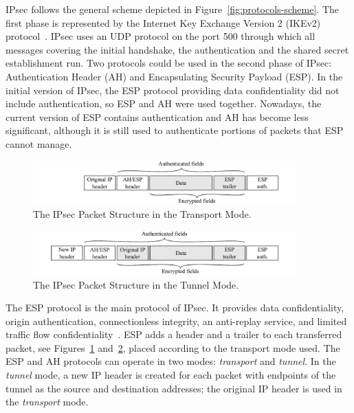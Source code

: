 IPsec follows the general scheme depicted in Figure~\ref{fig:protocols-scheme}. The first phase is represented by the Internet Key Exchange Version 2 (IKEv2) protocol~\cite{rfc5996}. IPsec uses an UDP protocol on the port 500 through which all messages covering the initial handshake, the authentication and the shared secret establishment run. Two protocols could be used in the second phase of IPsec: Authentication Header (AH) and Encapsulating Security Payload (ESP). In the initial version of IPsec, the ESP protocol providing data confidentiality did not include authentication, so ESP and AH were used together. Nowadays, the current version of ESP contains authentication and AH has become less significant, although it is still used to authenticate portions of packets that ESP cannot manage.



\begin{figure}[!ht]
  \centering
  \includegraphics[width=0.9\textwidth]{figures/paper-encrypted/ipsec_transport_mode}
  \caption{The IPsec Packet Structure in the Transport Mode.}
  \label{fig:ipsec-transport-mode}
\end{figure}

\begin{figure}[!ht]
  \centering
  \includegraphics[width=0.9\textwidth]{figures/paper-encrypted/ipsec_tunnel_mode}
  \caption{The IPsec Packet Structure in the Tunnel Mode.}
  \label{fig:ipsec-tunnel-mode}
\end{figure}

The ESP protocol is the main protocol of IPsec. It provides data confidentiality, origin authentication, connectionless integrity, an anti-replay service, and limited traffic flow confidentiality~\cite{rfc4303}. ESP adds a header and a trailer to each transferred packet, see Figures~\ref{fig:ipsec-transport-mode} and~\ref{fig:ipsec-tunnel-mode}, placed according to the transport mode used. The ESP and AH protocols can operate in two modes: \textit{transport} and \textit{tunnel}. In the \textit{tunnel} mode, a new IP header is created for each packet with endpoints of the tunnel as the source and destination addresses; the original IP header is used in the \textit{transport} mode.



